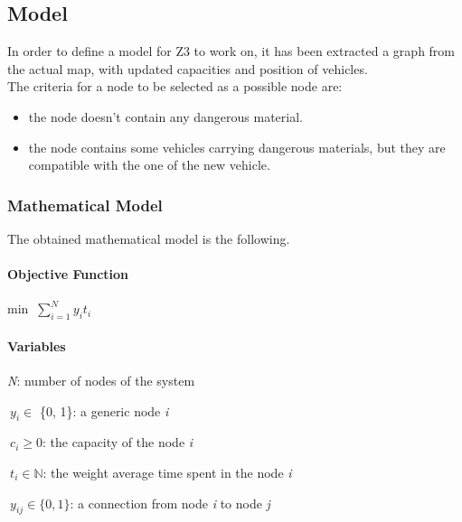 
\subsection{Model}
In order to define a model for Z3 to work on, it has been extracted a graph from the actual map, with updated capacities and position of vehicles.\\
The criteria for a node to be selected as a possible node are: 
\begin{itemize}
	\item the node doesn't contain any dangerous material.
	\item the node contains some vehicles carrying dangerous materials, but they are compatible with the one of the new vehicle.\\
\end{itemize}

\subsubsection{Mathematical Model}\label{Subs:MathModel}
The obtained mathematical model is the following.

\paragraph{Objective Function}
\begin{description}
	\item min $\ \sum_{i=1}^{N} y_{i}t_{i}$
\end{description}
\paragraph{Variables}
\begin{description}
	\item \textit{N}: number of nodes of the system
	\item $\ y_{i} \in$ \{0, 1\}: a generic node \textit{i}
	\item $\ c_{i} \geq 0$: the capacity of the node \textit{i}
	\item $\ t_{i} \in \mathbb{N}$: the weight average time spent in the node \textit{i}
	\item $\ y_{ij} \in \{0, 1\}$: a connection from node \textit{i} to node \textit{j} 
\end{description}

